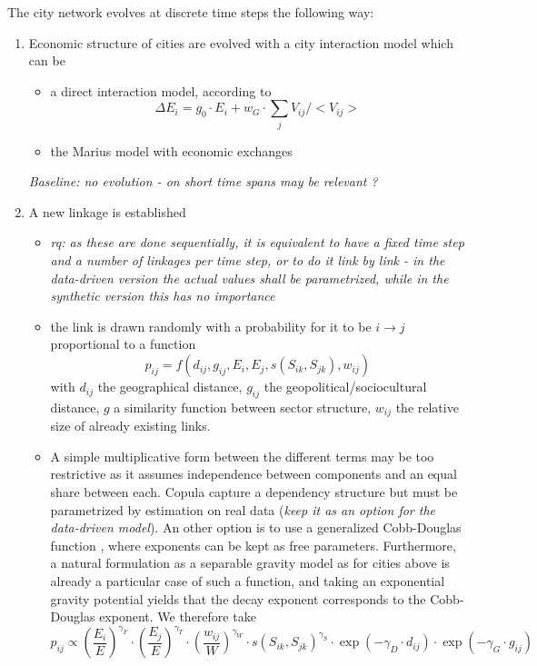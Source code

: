 \documentclass{article}
\begin{document}
The city network evolves at discrete time steps the following way:
\begin{enumerate}
    \item Economic structure of cities are evolved with a city interaction model which can be
    \begin{itemize}
        \item a direct interaction model, according to
        \begin{equation}
            \Delta E_i = g_0\cdot E_i + w_G \cdot \sum_j V_{ij}/<V_{ij}>
        \end{equation}
        \item the Marius model with economic exchanges
    \end{itemize}
    \textit{Baseline: no evolution - on short time spans may be relevant ?}
    \item A new linkage is established
    \begin{itemize}
        \item \textit{rq: as these are done sequentially, it is equivalent to have a fixed time step and a number of linkages per time step, or to do it link by link - in the data-driven version the actual values shall be parametrized, while in the synthetic version this has no importance}
        \item the link is drawn randomly with a probability for it to be $i \rightarrow j$ proportional to a function
    \begin{equation}
        p_{ij} = f(d_{ij},g_{ij},E_i,E_j,s(S_{ik},S_{jk}),w_{ij})
    \end{equation}
    with $d_{ij}$ the geographical distance, $g_{ij}$ the geopolitical/sociocultural distance, $g$ a similarity function between sector structure, $w_{ij}$ the relative size of already existing links.
    \item A simple multiplicative form between the different terms may be too restrictive as it assumes independence between components and an equal share between each. Copula capture a dependency structure but must be parametrized by estimation on real data (\textit{keep it as an option for the data-driven model}). An other option is to use a generalized Cobb-Douglas function \citep{vilcu2011geometric}, where exponents can be kept as free parameters. Furthermore, a natural formulation as a separable gravity model as for cities above is already a particular case of such a function, and taking an exponential gravity potential yields that the decay exponent corresponds to the Cobb-Douglas exponent. We therefore take
    \begin{equation}
     p_{ij} \propto \left(\frac{E_{i}}{E}\right)^{\gamma_F} \cdot \left(\frac{E_{j}}{E}\right)^{\gamma_T} \cdot \left(\frac{w_{ij}}{W}\right)^{\gamma_W} \cdot s(S_{ik},S_{jk})^{\gamma_S} \cdot \exp \left(- \gamma_D \cdot d_{ij}\right) \cdot \exp \left(- \gamma_G \cdot g_{ij}\right)
    \end{equation}
    

\end{itemize}
\end{enumerate}
\end{document}

